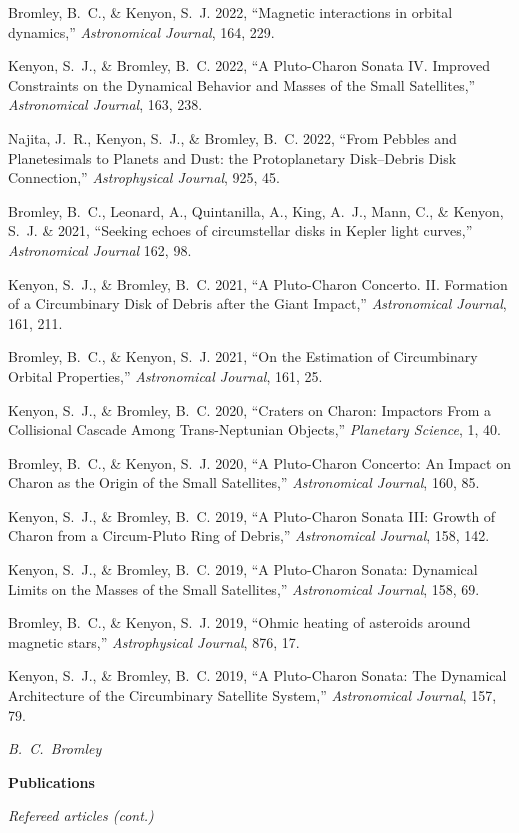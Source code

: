 \documentclass[11pt]{article}
\def\refitem{} %
\def\defsty{\setlength{\parskip}{11pt}
\setlength{\oddsidemargin}{0.0in}
\setlength{\evensidemargin}{0.0in}
\setlength{\parindent}{0in}}
\def\bibsty{\setlength{\parskip}{0pt}
\setlength{\oddsidemargin}{0.33in}
\setlength{\evensidemargin}{0.33in}
\setlength{\parindent}{-0.33in}}
\newcommand{\shead}[1]{\vspace{12.5pt}\centerline{{\bf{#1}}}}
\begin{document}
\refitem Bromley, B.~C., \& Kenyon, S.~J. 2022, ``Magnetic interactions in orbital dynamics,''
{\em Astronomical Journal}, 164, 229.

\refitem Kenyon, S.~J., \& Bromley, B.~C. 2022,
``A Pluto-Charon Sonata IV. Improved Constraints on the Dynamical Behavior and Masses of the Small Satellites,''
{\em Astronomical Journal}, 163, 238.

\refitem Najita, J.~R., Kenyon, S.~J., \& Bromley, B.~C. 2022,
``From Pebbles and Planetesimals to Planets and Dust: the Protoplanetary Disk--Debris Disk Connection,''
{\em Astrophysical Journal}, 925, 45.

\refitem Bromley, B.~C., Leonard, A., Quintanilla, A., King, A.~J., Mann, C., \& 
Kenyon, S.~J. \& 
2021,
``Seeking echoes of circumstellar disks in Kepler light curves,''
{\em Astronomical Journal} 162, 98.

\refitem Kenyon, S.~J., \& Bromley, B.~C. 2021,
``A Pluto-Charon Concerto. II. Formation of a Circumbinary Disk of Debris after the Giant Impact,''
{\em Astronomical Journal}, 161, 211.

\refitem Bromley, B.~C., \& Kenyon, S.~J. 2021, ``On the Estimation of
Circumbinary Orbital Properties,''
{\em Astronomical Journal}, 161, 25.

\refitem Kenyon, S.~J., \& Bromley, B.~C. 2020, ``Craters on Charon:
Impactors From a Collisional Cascade Among Trans-Neptunian Objects,''
{\em Planetary Science}, 1, 40.

\refitem Bromley, B.~C., \& Kenyon, S.~J. 2020, ``A Pluto-Charon
Concerto: An Impact on Charon as the Origin of the Small Satellites,''
{\em Astronomical Journal}, 160, 85.

\refitem Kenyon, S.~J., \& Bromley, B.~C. 2019, ``A Pluto-Charon Sonata III:
Growth of Charon from a Circum-Pluto Ring of Debris,''
{\em Astronomical Journal}, 158, 142.

\refitem Kenyon, S.~J., \& Bromley, B.~C. 2019, ``A Pluto-Charon Sonata: Dynamical Limits on the Masses of the Small Satellites,''
{\em Astronomical Journal}, 158, 69.

\refitem Bromley, B.~C., \& Kenyon, S.~J. 2019, ``Ohmic heating of
asteroids around magnetic stars,'' {\em Astrophysical Journal}, 876,
17.

\refitem Kenyon, S.~J., \& Bromley, B.~C. 2019, ``A Pluto-Charon Sonata: The Dynamical Architecture of the Circumbinary Satellite System,''
{\em Astronomical Journal}, 157, 79.

\newpage
\defsty
\mbox{} \hfill {\it B.\ C.\ Bromley}
\vspace{-11pt}
\shead{Publications}
\centerline{\em Refereed articles (cont.)}
\vspace{-5.5pt}
\bibsty
\end{document}
